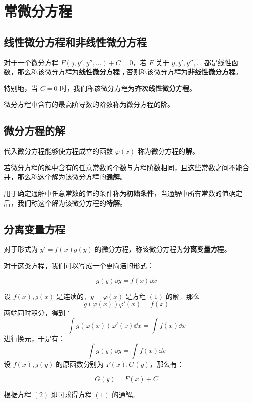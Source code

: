 \section{常微分方程}

\subsection{线性微分方程和非线性微分方程}

\begin{definition}[线性微分方程]
    对于一个微分方程 $F(y, y', y'', \dots) + C = 0$，若 $F$ 关于 $y, y', y'', \dots$ 都是线性函数，那么称该微分方程为\textbf{线性微分方程}；否则称该微分方程为\textbf{非线性微分方程}。

    特别地，当 $C = 0$ 时，我们称该微分方程为\textbf{齐次线性微分方程}。
\end{definition}

微分方程中含有的最高阶导数的阶数称为微分方程的\textbf{阶}。

\subsection{微分方程的解}

代入微分方程能够使方程成立的函数 $\varphi(x)$ 称为微分方程的\textbf{解}。

若微分方程的解中含有的任意常数的个数与方程阶数相同，且这些常数之间不能合并，那么称这个解为该微分方程的\textbf{通解}。

用于确定通解中任意常数的值的条件称为\textbf{初始条件}，当通解中所有常数的值确定后，我们称这个解为该微分方程的\textbf{特解}。

\subsection{分离变量方程}

\begin{definition}[分离变量方程]
    对于形式为 $y' = f(x) g(y)$ 的微分方程，称该微分方程为\textbf{分离变量方程}。
\end{definition}

对于这类方程，我们可以写成一个更简洁的形式：

\begin{equation}
    g(y) \dd{y} = f(x) \dd{x} \tag{1}
\end{equation}


设 $f(x), g(x)$ 是连续的，$y = \varphi(x)$ 是方程 $(1)$ 的解，那么
$$
g(\varphi(x)) \varphi'(x) = f(x)
$$
两端同时积分，得到：
$$
\int g(\varphi(x)) \varphi'(x) \dd{x} = \int f(x) \dd{x}
$$
进行换元，于是有：
$$
\int g(y) \dd{y} = \int f(x) \dd{x}
$$
设 $f(x), g(y)$ 的原函数分别为 $F(x), G(y)$，那么有：

\begin{equation}
    G(y) = F(x) + C \tag{2}
\end{equation}

根据方程 $(2)$ 即可求得方程 $(1)$ 的通解。
